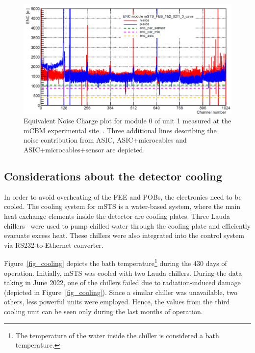 \begin{figure}[!h]
\centering
\includegraphics[width=0.9\columnwidth]{Chapter6/DCS/images/U1M1_ENC.png}
\caption{Equivalent Noise Charge plot for module 0 of unit 1 measured at the \gls{mCBM} experimental site~\cite{Adrian}. Three additional lines describing the noise contribution from ASIC, ASIC+microcables and ASIC+microcables+sensor are depicted.}
\label{fig_msts_ENC2}
\end{figure}


\subsection{Considerations about the detector cooling}
\label{msts_cooling}
In order to avoid overheating of the \gls{FEE} and \glspl{POB}, the electronics need to be cooled. The cooling system for \gls{mSTS} is a water-based  system, where the main heat exchange elements inside the detector are cooling plates. Three Lauda chillers~\cite{Lauda1} were used to pump chilled water through the cooling plate and efficiently evacuate excess heat. These chillers were also integrated into the control system via RS232-to-Ethernet converter.

Figure~\ref{fig_cooling} depicts the bath temperature\footnote{The temperature of the water inside the chiller is considered a bath temperature.} during the 430 days of operation. Initially, \gls{mSTS} was cooled with two Lauda chillers. During the data taking in June 2022, one of the chillers failed due to radiation-induced damage (depicted in Figure~\ref{fig_cooling}). Since a similar chiller was unavailable, two others, less powerful units were employed. Hence, the values from the third cooling unit can be seen only during the last months of operation. 

